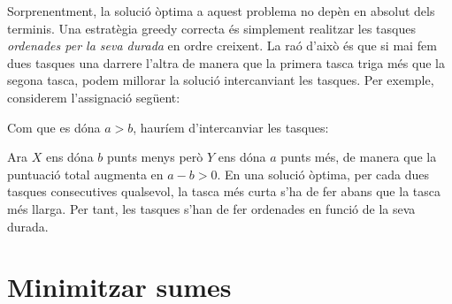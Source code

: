 Sorprenentment, la solució òptima a aquest problema
no depèn en absolut dels terminis.
Una estratègia greedy correcta és simplement
realitzar les tasques \emph{ordenades per la seva durada}
en ordre creixent.
La raó d'això és que si mai fem
dues tasques una darrere l'altra de manera que la primera tasca
triga més que la segona tasca, podem millorar la solució
intercanviant les tasques. Per exemple, considerem
l'assignació següent:
\begin{center}
\end{center}
Com que es dóna $a>b$, hauríem d'intercanviar les tasques:
\begin{center}
\end{center}
Ara $X$ ens dóna $b$ punts menys però $Y$ ens dóna $a$ punts més,
de manera que la puntuació total augmenta en $a-b > 0$.
En una solució òptima,
per cada dues tasques consecutives qualsevol,
la tasca més curta s'ha de fer abans que la tasca més llarga.
Per tant, les tasques s'han de fer ordenades
en funció de la seva durada.

\section{Minimitzar sumes}

